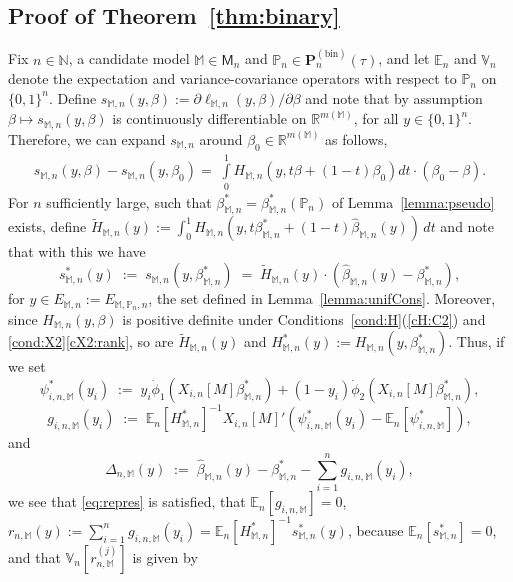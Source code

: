 \documentclass[preprint]{imsart}
\newcommand{\R}{{\mathbb R}}
\newcommand{\E}{{\mathbb E}}
\newcommand{\V}{{\mathbb V}}
\renewcommand{\P}{{\mathbb P}}
\newcommand{\N}{{\mathbb N}}
\newcommand{\M}{\mathbb M}
\numberwithin{equation}{section}
\begin{document}


\subsection{Proof of Theorem~\ref{thm:binary}}

Fix $n\in\N$, a candidate model $\M\in\mathsf{M}_n$ and $\P_n \in \mathbf{P}_n^{(\mathrm{bin})}(\tau)$, and let $\E_n$ and $\V_n$ denote the expectation and variance-covariance operators with respect to $\P_n$ on $\{0,1\}^n$. Define $s_{\M,n}(y,\beta) := \partial \ell_{\M,n}(y,\beta)/\partial\beta$ and note that by assumption $\beta\mapsto s_{\M,n}(y,\beta)$ is continuously differentiable on $\R^{m(\M)}$, for all $y\in\{0,1\}^n$.
Therefore, we can expand $s_{\M,n}$ around $\beta_0\in\R^{m(\M)}$ as follows,
\begin{align*}
s_{\M,n}(y,\beta) - s_{\M,n}(y,\beta_0) =\; \int\limits_0^1 H_{\M,n}(y,t\beta + (1-t) \beta_0) dt\cdot (\beta_0-\beta).
\end{align*}
For $n$ sufficiently large, such that $\beta_{\M,n}^* = \beta_{\M,n}^*(\P_n)$ of Lemma~\ref{lemma:pseudo} exists, define $\tilde{H}_{\M,n}(y) := \int_0^1 H_{\M,n}(y,t\beta_{\M,n}^* + (1-t)\hat{\beta}_{\M,n}(y))\,dt$ and note that with this we have 
\begin{equation}\label{eq:thm:binary:sstar}
s_{\M,n}^*(y) \;:=\; s_{\M,n}(y,\beta_{\M,n}^*) \;=\; \tilde{H}_{\M,n}(y)\cdot(\hat{\beta}_{\M,n}(y) - \beta_{\M,n}^*),
\end{equation}
for $y\in E_{\M,n} := E_{\M,\P_n,n}$, the set defined in Lemma~\ref{lemma:unifCons}. Moreover, since $H_{\M,n}(y,\beta)$ is positive definite under Conditions~\ref{cond:H}(\ref{cH:C2}) and \ref{cond:X2}\eqref{cX2:rank}, so are $\tilde{H}_{\M,n}(y)$ and $H_{\M,n}^*(y) := H_{\M,n}(y,\beta_{\M,n}^*)$. Thus, if we set 
$$
\psi_{i,n,\M}^*(y_i) \;:=\; y_i\dot{\phi}_1(X_{i,n}[M]\beta_{\M,n}^*) + (1-y_i)\dot{\phi}_2(X_{i,n}[M]\beta_{\M,n}^*),
$$
$$
g_{i,n,\M}(y_i) \;:=\; \E_n[H_{\M,n}^*]^{-1} X_{i,n}[M]' \left( \psi_{i,n,\M}^*(y_i) - \E_n[\psi_{i,n,\M}^*] \right),
$$
and
$$
\Delta_{n,\M}(y) \;:=\; \hat{\beta}_{\M,n}(y) - \beta_{\M,n}^* - \sum_{i=1}^n g_{i,n,\M}(y_i),
$$
we see that \eqref{eq:repres} is satisfied, that $\E_n[g_{i,n,\M}] = 0$, $r_{n,\M}(y) := \sum_{i=1}^n g_{i,n,\M}(y_i) = \E_n[H_{\M,n}^*]^{-1} s_{\M,n}^*(y)$, because $\E_n[s_{\M,n}^*] = 0$, and that $\V_n[r_{n,\M}^{(j)}]$ is given by
\end{document}
